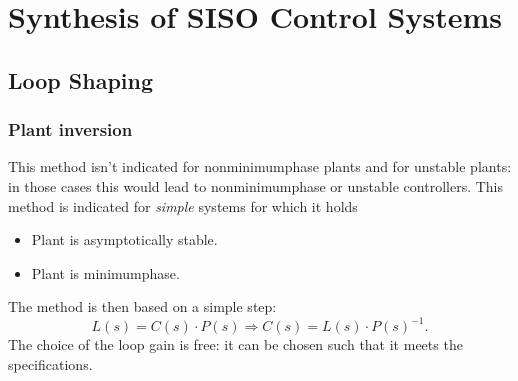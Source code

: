 \documentclass[a4paper,12 pt]{article}
\numberwithin{equation}{section}
\theoremstyle{definition}
\theoremstyle{remark}
\theoremstyle{definition}
\theoremstyle{definition}
\theoremstyle{definition}
\theoremstyle{remark}
\begin{document}
\section{Synthesis of SISO Control Systems}
\subsection{Loop Shaping}
\subsubsection{Plant inversion}
This method isn't indicated for nonminimumphase plants and for unstable plants: in those cases this would lead to nonminimumphase or unstable controllers. This method is indicated for \textit{simple} systems for which it holds
\begin{itemize}
\item Plant is asymptotically stable.
\item Plant is minimumphase.
\end{itemize}
The method is then based on a simple step:
\begin{equation}
L(s)=C(s)\cdot P(s) \Rightarrow C(s)=L(s)\cdot P(s)^{-1}.
\end{equation}
The choice of the loop gain is free: it can be chosen such that it meets the specifications. 
\end{document}
